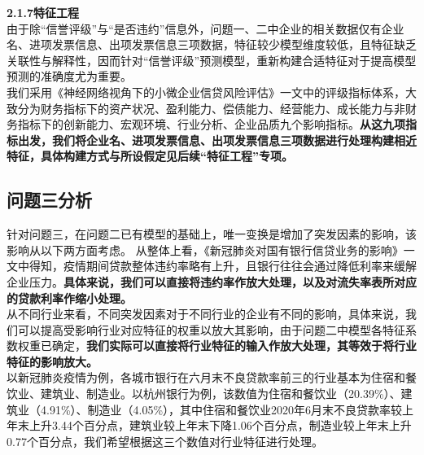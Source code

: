 \documentclass[bwprint]{cumcm}
\begin{document}
\noindent \textbf{2.1.7特征工程}\\
 \indent 由于除“信誉评级”与“是否违约”信息外，问题一、二中企业的相关数据仅有企业名、进项发票信息、出项发票信息三项数据，特征较少模型维度较低，且特征缺乏关联性与解释性，因而针对“信誉评级”预测模型，重新构建合适特征对于提高模型预测的准确度尤为重要。\\
  \indent 我们采用《神经网络视角下的小微企业信贷风险评估》一文中的评级指标体系，大致分为财务指标下的资产状况、盈利能力、偿债能力、经营能力、成长能力与非财务指标下的创新能力、宏观环境、行业分析、企业品质九个影响指标。\textbf{从这九项指标出发，我们将企业名、进项发票信息、出项发票信息三项数据进行处理构建相近特征，具体构建方式与所设假定见后续“特征工程”专项。}


\subsection{\heiti 问题三分析}

针对问题三，在问题二已有模型的基础上，唯一变换是增加了突发因素的影响，该影响从以下两方面考虑。
从整体上看，《新冠肺炎对国有银行信贷业务的影响》一文中得知，疫情期间贷款整体违约率略有上升，且银行往往会通过降低利率来缓解企业压力。\textbf{具体来说，我们可以直接将违约率作放大处理，以及对流失率表所对应的贷款利率作缩小处理。}\\
  \indent 从不同行业来看，不同突发因素对于不同行业的企业有不同的影响，具体来说，我们可以提高受影响行业对应特征的权重以放大其影响，由于问题二中模型各特征系数权重已确定，\textbf{我们实际可以直接将行业特征的输入作放大处理，其等效于将行业特征的影响放大。}\\
  \indent 以新冠肺炎疫情为例，各城市银行在六月末不良贷款率前三的行业基本为住宿和餐饮业、建筑业、制造业。以杭州银行为例，该数值为住宿和餐饮业（20.39\%）、建筑业（4.91\%）、制造业（4.05\%），其中住宿和餐饮业2020年6月末不良贷款率较上年末上升3.44个百分点，建筑业较上年末下降1.06个百分点，制造业较上年末上升0.77个百分点，我们希望根据这三个数值对行业特征进行处理。
\\
\\
\\
\end{document}
